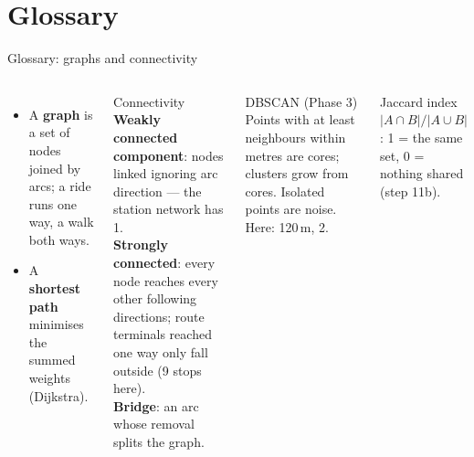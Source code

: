 \documentclass[aspectratio=169,10pt]{beamer}
\newcommand{\code}[1]{\texttt{\detokenize{#1}}}
\begin{document}
\section{Glossary}
\begin{frame}{Glossary: graphs and connectivity}
  \begin{columns}[T]
    \centering
    \vskip0.3cm
    \scriptsize
    \begin{itemize}
      \item A \textbf{graph} is a set of nodes joined by arcs; a ride runs one way, a walk both ways.
      \item A \textbf{shortest path} minimises the summed weights (Dijkstra).
    \end{itemize}
    \scriptsize
    \begin{block}{Connectivity}
      \textbf{Weakly connected component}: nodes linked ignoring arc direction --- the station network has 1.\\[3pt]
      \textbf{Strongly connected}: every node reaches every other following directions; route terminals
      reached one way only fall outside (9 stops here).\\[3pt]
      \textbf{Bridge}: an arc whose removal splits the graph.
    \end{block}
    \begin{block}{DBSCAN (Phase 3)}
      Points with at least \code{min_samples} neighbours within \code{eps} metres are cores; clusters grow
      from cores. Isolated points are noise. Here: \code{eps} 120\,m, \code{min_samples} 2.
    \end{block}
    \begin{block}{Jaccard index}
      $|A \cap B| / |A \cup B|$: 1 = the same set, 0 = nothing shared (step 11b).
    \end{block}
  \end{columns}
\end{frame}
\end{document}

